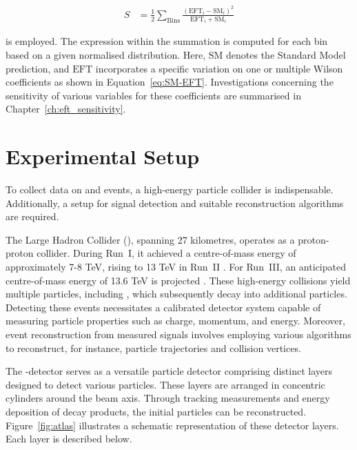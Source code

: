\documentclass[bachelor,ngerman,english]{GAUBM}
\begin{document}
\begin{align}
S &= \frac{1}{2}\sum_\text{Bins}\frac{\left(\text{EFT}_i-\text{SM}_i\right)^2}{\text{EFT}_i+\text{SM}_i}\label{eq:SeparationPower}
\end{align}

is employed. The expression within the summation is computed for each bin based on a given normalised distribution. Here, $\text{SM}$ denotes the Standard Model prediction, and $\text{EFT}$ incorporates a specific variation on one or multiple Wilson coefficients as shown in Equation~\ref{eq:SM-EFT}. Investigations concerning the sensitivity of various variables for these coefficients are summarised in Chapter~\ref{ch:eft_sensitivity}.


\chapter{Experimental Setup}
\label{ch:experimental_setup}
To collect data on \ttbarZ and \ttbarW events, a high-energy particle collider is indispensable. Additionally, a setup for signal detection and suitable reconstruction algorithms are required.

The Large Hadron Collider (\lhc), spanning 27 kilometres, operates as a proton-proton collider. During Run~I, it achieved a centre-of-mass energy of approximately 7-8 TeV, rising to 13 TeV in Run~II \cite{lhc2}. For Run~III, an anticipated centre-of-mass energy of 13.6 TeV is projected \cite{lhc_run3}. These high-energy collisions yield multiple particles, including \tquarks, which subsequently decay into additional particles. Detecting these events necessitates a calibrated detector system capable of measuring particle properties such as charge, momentum, and energy. Moreover, event reconstruction from measured signals involves employing various algorithms to reconstruct, for instance, particle trajectories and collision vertices.

The \atlas-detector \cite{atlas} serves as a versatile particle detector comprising distinct layers designed to detect various particles. These layers are arranged in concentric cylinders around the beam axis. Through tracking measurements and energy deposition of decay products, the initial particles can be reconstructed. Figure~\ref{fig:atlas} illustrates a schematic representation of these detector layers. Each layer is described below.

\end{document}
